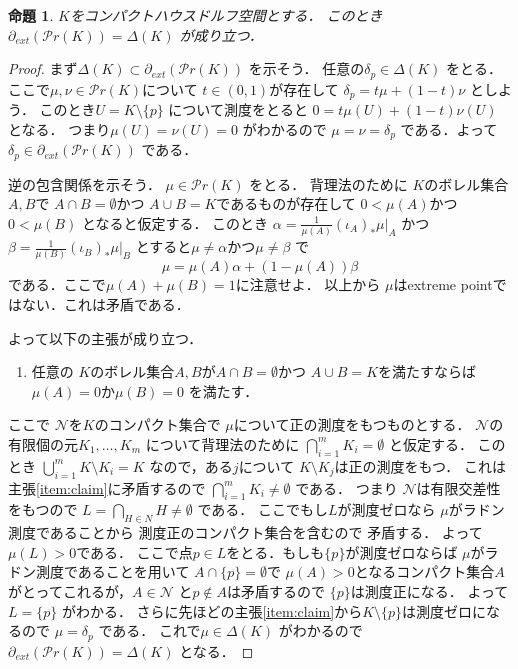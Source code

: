 \documentclass[leqno, a4paper, 12pt]{jsarticle}
\newtheorem{prop}[thm]{命題}
\newcommand{\myextreme}[1]{\partial_{ext}(#1)}
\newcommand{\myprob}[1]{\mathcal{P}r(#1)}
\newcommand{\mydiracset}[1]{\Delta(#1)}
\newcommand{\mydirac}[1]{\delta_{#1}}
\begin{document}
\begin{prop}\label{prop:equqlboundary}
$K$をコンパクトハウスドルフ空間とする．
このとき$\myextreme{\myprob{K}}=\mydiracset{K}$
が成り立つ．
\end{prop}
\begin{proof}
まず$\mydiracset{K}\subset \myextreme{\myprob{K}}$
を示そう．
任意の$\mydirac{p}\in \mydiracset{K}$
をとる．
ここで$\mu, \nu\in \myprob{K}$について
$t\in (0, 1)$が存在して
$\mydirac{p}=t\mu+(1-t)\nu$
としよう．
このとき$U=K\setminus \{p\}$
について測度をとると
$0=t\mu(U)+(1-t)\nu(U)$
となる．
つまり$\mu(U)=\nu(U)=0$
がわかるので
$\mu=\nu=\mydirac{p}$
である．よって
$\mydirac{p}\in \myextreme{\myprob{K}}$
である．

逆の包含関係を示そう．
$\mu\in \myprob{K}$
をとる．
背理法のために
$K$のボレル集合$A,B$で
$A\cap B=\emptyset$かつ
$A\cup B=K$であるものが存在して
$0<\mu(A)$かつ$0<\mu(B)$
となると仮定する．
このとき
$\alpha=\frac{1}{\mu(A)}(\iota_{A})_{*}\mu|_{A}$
かつ
$\beta=\frac{1}{\mu(B)}(\iota_{B})_{*}\mu|_{B}$
とすると$\mu\neq \alpha$かつ$\mu\neq \beta$
で
\[
\mu=\mu(A)\alpha+(1-\mu(A))\beta
\]
である．ここで$\mu(A)+\mu(B)=1$に注意せよ．
以上から
$\mu$はextreme pointではない．これは矛盾である．

よって以下の主張が成り立つ．
\begin{enumerate}[label=\textup{(Cl)}]
\item\label{item:claim}
任意の
$K$のボレル集合$A,B$が$A\cap B=\emptyset$かつ
$A\cup B=K$を満たすならば
$\mu(A)=0$か$\mu(B)=0$
を満たす．
\end{enumerate}
ここで
$\mathcal{N}$を$K$のコンパクト集合で
$\mu$について正の測度をもつものとする．
$\mathcal{N}$の有限個の元$K_{1}, \dots, K_{m}$
について背理法のために
$\bigcap_{i=1}^{m}K_{i}=\emptyset$
と仮定する．
このとき
$\bigcup_{i=1}^{m}K\setminus K_{i}=K$
なので，ある$j$について
$K\setminus K_{j}$は正の測度をもつ．
これは主張\ref{item:claim}に矛盾するので
$\bigcap_{i=1}^{m}K_{i}\neq\emptyset$
である．
つまり
$\mathcal{N}$は有限交差性をもつので
$L=\bigcap_{H\in N}H\neq \emptyset$
である．
ここでもし$L$が測度ゼロなら
$\mu$がラドン測度であることから
測度正のコンパクト集合を含むので
矛盾する．
よって
$\mu(L)>0$である．
ここで点$p\in L$をとる．もしも$\{p\}$が測度ゼロならば
$\mu$がラドン測度であることを用いて
$A\cap \{p\}=\emptyset$で
$\mu(A)>0$となるコンパクト集合$A$
がとってこれるが，$A\in \mathcal{N}$
と$p\not \in A$は矛盾するので
$\{p\}$は測度正になる．
よって$L=\{p\}$
がわかる．
さらに先ほどの主張\ref{item:claim}から$K\setminus \{p\}$は測度ゼロになるので
$\mu=\mydirac{p}$
である．
これで$\mu\in \mydiracset{K}$
がわかるので
$\myextreme{\myprob{K}}=\mydiracset{K}$
となる．
\end{proof}
\end{document}
